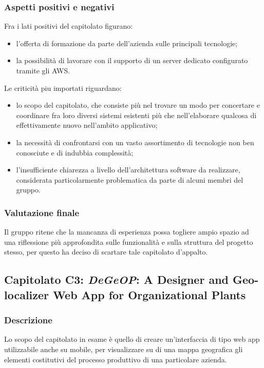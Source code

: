 		\subsubsection{Aspetti positivi e negativi}
		Fra i lati positivi del capitolato figurano:
		\begin{itemize}
			\item l'offerta di formazione da parte dell'azienda sulle principali tecnologie;
			\item la possibilità di lavorare con il supporto di un server dedicato configurato tramite gli AWS.
		\end{itemize}
		Le criticità piu importati riguardano:
		\begin{itemize}
			\item lo scopo del capitolato, che consiste più nel trovare un modo per concertare e coordinare fra loro diversi sistemi 
			esistenti più che nell'elaborare qualcosa di effettivamente nuovo nell'ambito applicativo;
			\item la necessità di confrontarsi con un vasto assortimento di tecnologie non ben conosciute e di indubbia complessità;
			\item l'insufficiente chiarezza a livello dell'architettura software da realizzare, considerata particolarmente problematica da 
			parte di alcuni membri del gruppo.
		\end{itemize}
		\subsubsection{Valutazione finale}
		Il gruppo ritene che la mancanza di esperienza possa togliere ampio spazio ad una riflessione più approfondita sulle funzionalità e sulla 
		struttura del progetto stesso, per questo ha deciso di scartare tale capitolato d'appalto.
		
	\subsection{Capitolato C3: \emph{DeGeOP}: A Designer and Geo-localizer Web App for Organizational Plants}
		\subsubsection{Descrizione}
		Lo scopo del capitolato in esame è quello di creare un'interfaccia di tipo web app utilizzabile anche su mobile, per visualizzare su di una 
		mappa geografica gli elementi costitutivi del processo produttivo di una particolare azienda.

